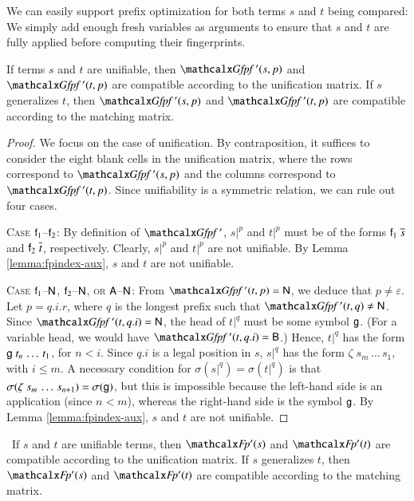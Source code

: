 We can easily support prefix optimization for both terms $s$ and $t$ being
compared: We simply add enough fresh variables as arguments to ensure that $s$
and $t$ are fully applied before computing their fingerprints.

\begin{lemma}\label{lemma:ehoh:fpindex-gfpf-sound-unif}
  If terms $s$ and $t$ are unifiable, then $\GfpfRTL(s, p)$ and $\GfpfRTL(t,
  p)$ are compatible according to the unification matrix.
  If $s$ generalizes $t$, then $\GfpfRTL(s, p)$ and $\GfpfRTL(t, p)$ are
  compatible according to the matching matrix.
\end{lemma}
\begin{proof}
  We focus on the case of unification. By contraposition, it suffices to
  consider the eight blank cells in the unification matrix, where the rows
  correspond to $\GfpfRTL(s, p)$ and the columns correspond to $\GfpfRTL(t,
  p)$. Since unifiability is a symmetric relation, we can rule out four cases.

\medskip

\noindent
\textsc{Case} $\cst{f}_1$--$\cst{f}_2$:\enskip
By definition of $\GfpfRTL$, $s|^{p}$ and $t|^{p}$ must be of the forms
$\cst{f}_1 \; \overline{s}$ and $\cst{f}_2 \; \overline{t}$, respectively.
Clearly, $s|^{p}$ and $t|^{p}$ are not unifiable. By Lemma
\ref{lemma:fpindex-aux}, $s$ and $t$ are not unifiable.

\medskip

\noindent
\textsc{Case} $\cst{f}_1$--$\NN$, $\cst{f}_2$--$\NN$, \textsc{or} $\AA$--$\NN$:\enskip
From $\GfpfRTL(t, p) = \NN$, we deduce that
$p \neq \varepsilon$.
Let $p = q.i.r$, where $q$ is the longest prefix such that $\GfpfRTL(t, q) \neq \NN$.
Since $\GfpfRTL(t, q.i) = \NN$, the head of $t|^{q}$ must be some symbol $\cst{g}$.
(For a variable head, we would have $\GfpfRTL(t, q.i) = \BB$.)
Hence, $t|^{q}$ has the form $\cst{g} \; t_n \, \ldots \, t_1$, for $n < i$.
Since $q.i$ is a legal position in $s$, $s|^{q}$ has the form
$\zeta \; s_m \, \ldots \, s_1$, with $i \le m$. A necessary condition for
$\sigma(s|^{q}) = \sigma(t|^{q})$ is that
$\sigma(\zeta \; s_m \, \ldots \, s_{n+1}) = \sigma(\cst{g})$,
but this is impossible because the left-hand side is an application (since
$n < m$), whereas the right-hand side is the symbol $\cst{g}$.
By Lemma \ref{lemma:fpindex-aux}, $s$ and $t$ are not unifiable.
\end{proof}

\begin{corollary}[Overapproximation]\,%
  If $s$ and $t$ are unifiable terms, then $\FpRTL(s)$ and $\FpRTL(t)$ are
  compatible according to the unification matrix.
  If $s$ generalizes $t$, then $\FpRTL(s)$ and $\FpRTL(t)$ are
  compatible according to the matching matrix.
\end{corollary}

